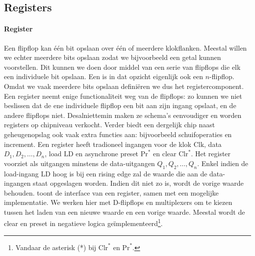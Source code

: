 \subsection{Registers}

\paragraph{Register}
Een flipflop kan \'e\'en bit opslaan over \'e\'en of meerdere klokflanken. Meestal willen we echter meerdere bits opslaan zodat we bijvoorbeeld een getal kunnen voorstellen. Dit kunnen we doen door middel van een serie van flipflops die elk een individuele bit opslaan. Een  is in dat opzicht eigenlijk ook een $n$-flipflop. Omdat we vaak meerdere bits opslaan defini\"eren we dus het registercomponent. Een register neemt enige functionaliteit weg van de flipflops: zo kunnen we niet beslissen dat de ene individuele flipflop een bit aan zijn ingang opslaat, en de andere flipflops niet. Desalniettemin maken ze schema's eenvoudiger en worden registers op chipniveau verkocht. Verder biedt een dergelijk chip naast geheugenopslag ook vaak extra functies aan: bijvoorbeeld schuifoperaties en increment. Een register heeft tradioneel ingangen voor de klok $\mbox{Clk}$, data $D_1, D_2,\ldots, D_n$, load $\mbox{LD}$ en asynchrone preset $\mbox{Pr}^*$ en clear $\mbox{Clr}^*$. Het register voorziet als uitgangen minstens de data-uitgangen $Q_1, Q_2, \ldots, Q_n$. Enkel indien de load-ingang $\mbox{LD}$ hoog is bij een rising edge zal de waarde die aan de data-ingangen staat opgeslagen worden. Indien dit niet zo is, wordt de vorige waarde behouden.  toont de interface van een register, samen met een mogelijke implementatie. We werken hier met D-flipflops en multiplexers om te kiezen tussen het laden van een nieuwe waarde en een vorige waarde. Meestal wordt de clear en preset in negatieve logica ge\"implementeerd\footnote{Vandaar de asterisk (*) bij $\mbox{Clr}^*$ en $\mbox{Pr}^*$.}.

